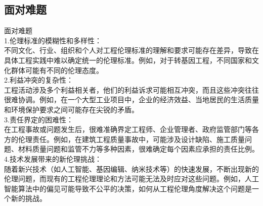 \documentclass[supercite]{Experimental_Report}
\theoremstyle{definition}
\begin{document}
	\subsection{面对难题}
	面对难题\\
	1.伦理标准的模糊性和多样性：\\不同文化、行业、组织和个人对工程伦理标准的理解和要求可能存在差异，导致在具体工程实践中难以确定统一的伦理标准。例如，对于转基因工程，不同国家和文化群体可能有不同的伦理态度。\\
	2.利益冲突的复杂性：\\工程活动涉及多个利益相关者，他们的利益诉求可能相互冲突，而且这些冲突往往很难协调。例如，在一个大型工业项目中，企业的经济效益、当地居民的生活质量和环境保护要求之间可能存在尖锐的矛盾。\\
	3.责任界定的困难性：\\在工程事故或问题发生后，很难准确界定工程师、企业管理者、政府监管部门等各方的伦理责任。例如，在建筑工程质量事故中，可能涉及设计缺陷、施工质量问题、材料质量问题和监管不力等多种因素，很难确定每个因素应承担的责任比例。\\
	4.技术发展带来的新伦理挑战：\\随着新兴技术（如人工智能、基因编辑、纳米技术等）的快速发展，不断出现新的伦理问题，而现有的工程伦理理论和方法可能无法及时应对这些问题。例如，人工智能算法中的偏见可能导致不公平的决策，如何从工程伦理角度解决这个问题是一个新的挑战。
	
\end{document}
